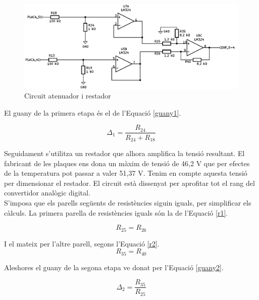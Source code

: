 \begin{figure}[H]
\begin{center}
\includegraphics[scale=0.3]{images/restador.png}
\end{center}
\caption{Circuit atenuador i restador}
\label{fig:restador}
\end{figure}

\noindent El guany de la primera etapa és el de l'Equació \ref{guany1}.

\begin{equation} \label{guany1}
\Delta_{1}=\frac{R_{24}}{R_{24}+R_{18}}
\end{equation}

\noindent Seguidament s'utilitza un restador que alhora amplifica la tensió resultant. El fabricant de les plaques ens dona un màxim de tensió de 46,2 V que per efectes de la temperatura pot passar a valer 51,37 V. Tenim en compte aquesta tensió per dimensionar el restador. El circuit està dissenyat per aprofitar tot el rang del convertidor analògic digital.\\
\newline S'imposa que els parells següents de resistències siguin iguals, per simplificar els càlculs. La primera parella de resistències iguals són la de l'Equació \ref{r1}.

\begin{equation} \label{r1}
R_{25}=R_{26}
\end{equation}

\noindent I el mateix per l'altre parell, segons l'Equació \ref{r2}.
\begin{equation} \label{r2}
R_{35}=R_{40}
\end{equation}

\noindent Aleshores el guany de la segona etapa ve donat per l'Equació \ref{guany2}.

\begin{equation} \label{guany2}
\Delta_{2}=\frac{R_{35}}{R_{25}}
\end{equation}

